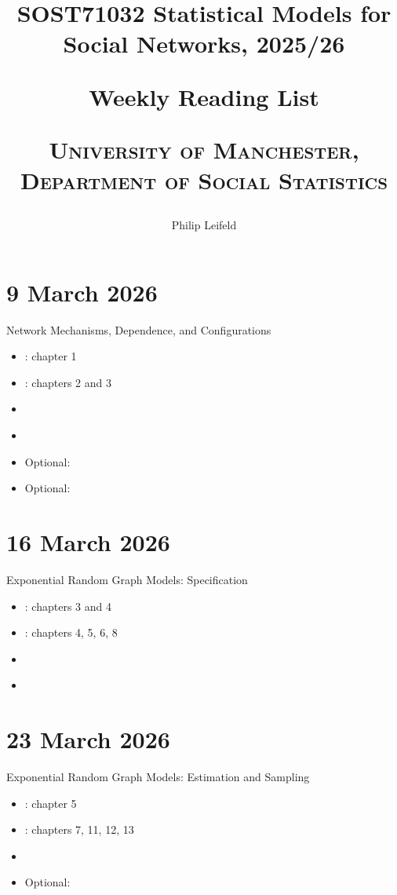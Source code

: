 \documentclass[a4paper,12pt]{article}
\title{%
\small{SOST71032 Statistical Models for Social Networks, 2025/26}

\LARGE{\textbf{Weekly Reading List}} \medskip

\small{\textsc{University of Manchester, Department of Social Statistics}} \bigskip
}
\author{Philip Leifeld}
\begin{document}
\maketitle

\section*{9 March 2026}
Network Mechanisms, Dependence, and Configurations

\begin{itemize}
	\item \citet{cranmer2020inferential}: chapter 1
	\item \citet{lusher2013exponential}: chapters 2 and 3
	\item \citet{butts2008network}
	\item \citet{butts2008social}
	\item Optional: \citet{handcock2008statnet}
	\item Optional: \citet{rawlings2023integrating}
\end{itemize}


\section*{16 March 2026}
Exponential Random Graph Models: Specification

\begin{itemize}
	\item \citet{cranmer2020inferential}: chapters 3 and 4
	\item \citet{lusher2013exponential}: chapters 4, 5, 6, 8
	\item \citet{goodreau2008statnet}
	\item \citet{morris2008specification}
\end{itemize}



\section*{23 March 2026}
Exponential Random Graph Models: Estimation and Sampling

\begin{itemize}
	\item \citet{cranmer2020inferential}: chapter 5
	\item \citet{lusher2013exponential}: chapters 7, 11, 12, 13
	\item \citet{hunter2008ergm}
	\item Optional: \citet{krivitsky2023ergm}
\end{itemize}
\end{document}
